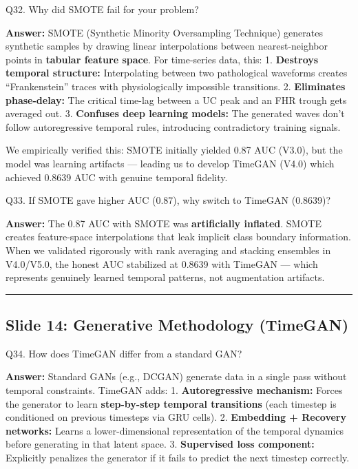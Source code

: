 \documentclass[11pt,a4paper]{article}
\begin{document}
\begin{questionbox}
Q32. Why did SMOTE fail for your problem?
\end{questionbox}
\textbf{Answer:} SMOTE (Synthetic Minority Oversampling Technique) generates
synthetic samples by drawing linear interpolations between
nearest-neighbor points in \textbf{tabular feature space}. For
time-series data, this: 1. \textbf{Destroys temporal structure:}
Interpolating between two pathological waveforms creates
``Frankenstein'' traces with physiologically impossible transitions. 2.
\textbf{Eliminates phase-delay:} The critical time-lag between a UC peak
and an FHR trough gets averaged out. 3. \textbf{Confuses deep learning
models:} The generated waves don't follow autoregressive temporal rules,
introducing contradictory training signals.

We empirically verified this: SMOTE initially yielded 0.87 AUC (V3.0),
but the model was learning artifacts --- leading us to develop TimeGAN
(V4.0) which achieved 0.8639 AUC with genuine temporal fidelity.

\begin{questionbox}
Q33. If SMOTE gave higher AUC (0.87), why switch to TimeGAN
(0.8639)?
\end{questionbox}
\textbf{Answer:} The 0.87 AUC with SMOTE was \textbf{artificially inflated}.
SMOTE creates feature-space interpolations that leak implicit class
boundary information. When we validated rigorously with rank averaging
and stacking ensembles in V4.0/V5.0, the honest AUC stabilized at 0.8639
with TimeGAN --- which represents genuinely learned temporal patterns,
not augmentation artifacts.

\begin{center}\rule{0.5\linewidth}{0.5pt}\end{center}

\subsection{Slide 14: Generative Methodology
(TimeGAN)}\label{slide-14-generative-methodology-timegan}

\begin{questionbox}
Q34. How does TimeGAN differ from a standard GAN?
\end{questionbox}
\textbf{Answer:} Standard GANs (e.g., DCGAN) generate data in a single pass
without temporal constraints. TimeGAN adds: 1. \textbf{Autoregressive
mechanism:} Forces the generator to learn \textbf{step-by-step temporal
transitions} (each timestep is conditioned on previous timesteps via GRU
cells). 2. \textbf{Embedding + Recovery networks:} Learns a
lower-dimensional representation of the temporal dynamics before
generating in that latent space. 3. \textbf{Supervised loss component:}
Explicitly penalizes the generator if it fails to predict the next
timestep correctly.
\end{document}
